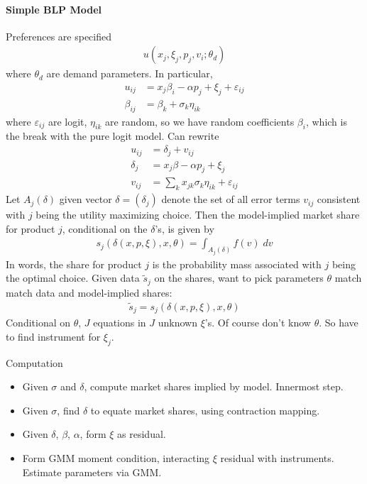 \documentclass[12pt]{article}
\theoremstyle{plain}
\theoremstyle{definition}
\theoremstyle{remark}
\begin{document}
\paragraph{Simple BLP Model}
Preferences are specified
\begin{align*}
  u(x_j,\xi_j,p_j,v_i;\theta_d)
\end{align*}
where $\theta_d$ are demand parameters.
In particular,
\begin{align*}
  u_{ij}
  &= x_j\beta_i - \alpha p_j + \xi_j + \varepsilon_{ij}
  \\
  \beta_{ij}
  &= \beta_k + \sigma_k \eta_{ik}
\end{align*}
where $\varepsilon_{ij}$ are logit, $\eta_{ik}$ are random, so we have
random coefficients $\beta_i$, which is the break with the pure logit
model.
Can rewrite
\begin{align*}
  u_{ij}
  &=
  \delta_j + v_{ij}
  \\
  \delta_j
  &=
  x_j\beta - \alpha p_j + \xi_j
  \\
  v_{ij}
  &=
  \sum_k  x_{jk} \sigma_k \eta_{ik}
  + \varepsilon_{ij}
\end{align*}
Let $A_j(\delta)$ given vector $\delta=(\delta_j)$ denote the set of
all error terms $v_{ij}$ consistent with $j$ being the utility
maximizing choice.
Then the model-implied market share for product $j$, conditional on the
$\delta$'s, is given by
\begin{align*}
  s_j(\delta(x,p,\xi),x,\theta)
  =
  \int_{A_j(\delta)} f(v)\;dv
\end{align*}
In words, the share for product $j$ is the probability mass associated
with $j$ being the optimal choice.
Given data $\tilde{s}_j$ on the shares,
want to pick parameters $\theta$ match match data and model-implied
shares:
\begin{align*}
  \tilde{s}_j
  =
  s_j(\delta(x,p,\xi),x,\theta)
\end{align*}
Conditional on $\theta$, $J$ equations in $J$ unknown $\xi$'s.
Of course don't know $\theta$. So have to find instrument for $\xi_j$.


Computation
\begin{itemize}
  \item Given $\sigma$ and $\delta$, compute market shares implied by
    model. Innermost step.
  \item Given $\sigma$, find $\delta$ to equate market shares, using
    contraction mapping.
  \item Given $\delta$, $\beta$, $\alpha$, form $\xi$ as residual.
  \item Form GMM moment condition, interacting $\xi$ residual with
    instruments.
    Estimate parameters via GMM.
\end{itemize}
\end{document}
